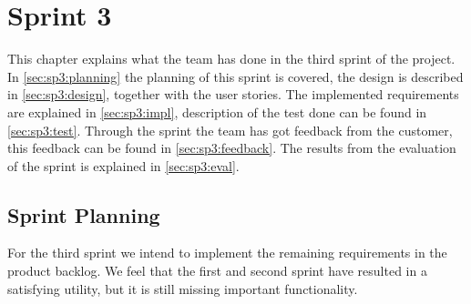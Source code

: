 \chapter{Sprint 3}
This chapter explains what the team has done in the third sprint of the 
project. In \autoref{sec:sp3:planning} the planning of this sprint is covered, 
the design is described in \autoref{sec:sp3:design}, together with the user 
stories. The implemented requirements are explained in \autoref{sec:sp3:impl}, 
description of the test done can be found in \autoref{sec:sp3:test}. Through 
the sprint the team has got feedback from the customer, this feedback can be 
found in \autoref{sec:sp3:feedback}.  The results from the evaluation of the 
sprint is explained in \autoref{sec:sp3:eval}.

\section{Sprint Planning}
\label{sec:sp3:planning}
For the third sprint we intend to implement the remaining requirements in the product backlog. We feel that the first and second sprint have resulted in a satisfying \gls{utility}, but it is still missing important functionality.

